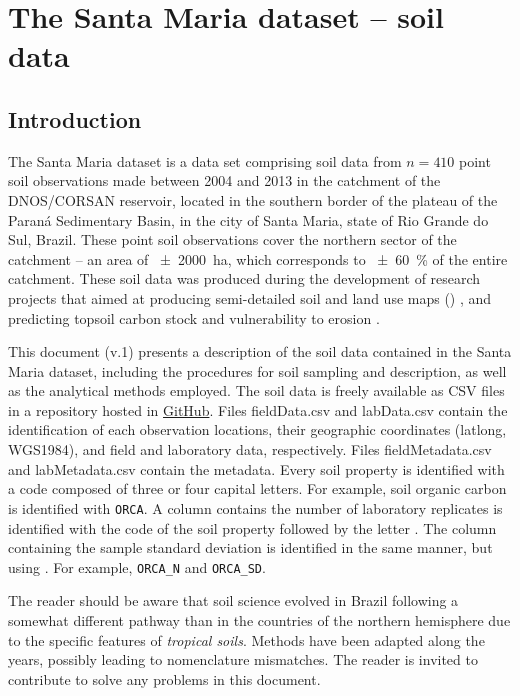 \artigotrue
\chapter{The Santa Maria dataset -- soil data}
\label{chap:chap03}

\tocless\section{Introduction}

The Santa Maria dataset is a data set comprising soil data from $n = 410$ point soil observations 
made between 2004 and 2013 in the catchment of the DNOS/CORSAN reservoir, located in the southern 
border of the plateau of the Paraná Sedimentary Basin, in the city of Santa Maria, state of Rio 
Grande do Sul, Brazil. These point soil observations cover the northern sector of the catchment -- 
an area of \SI{\pm2000}{\hectare}, which corresponds to \SI{\pm60}{\percent} of the entire 
catchment. These soil data was produced during the development of research projects that aimed at 
producing semi-detailed soil and land use maps () \cite{Pedron2005, Miguel2010, 
SamuelRosaEtAl2011a, MiguelEtAl2012}, and predicting topsoil carbon stock and vulnerability to erosion 
\cite{Samuel-Rosa2009, MouraBueno2012, Miguel2013}.

This document (v.1) presents a description of the soil data contained in the Santa Maria dataset, 
including the procedures for soil sampling and description, as well as the analytical methods 
employed. The soil data is freely available as CSV files in a repository hosted in
\href{https://github.com/samuel-rosa/dnos-sm-rs-general/tree/master/data}{GitHub}. Files 
fieldData.csv and labData.csv contain the identification of each observation locations, their 
geographic coordinates (latlong, WGS1984), and field and laboratory data, respectively. Files 
fieldMetadata.csv and labMetadata.csv contain the metadata. Every soil property is identified with a 
code composed of three or four capital letters. For example, soil organic carbon is identified with 
\texttt{ORCA}. A column contains the number of laboratory replicates is identified with the code of 
the soil property followed by the letter . The column containing the sample standard deviation 
is identified in the same manner, but using . For example, \texttt{ORCA\_N} and \texttt{ORCA\_SD}.

The reader should be aware that soil science evolved in Brazil following a somewhat different 
pathway than in the countries of the northern hemisphere due to the specific features of 
\emph{tropical soils}. Methods have been adapted along the years, possibly leading to nomenclature 
mismatches. The reader is invited to contribute to solve any problems in this document.

